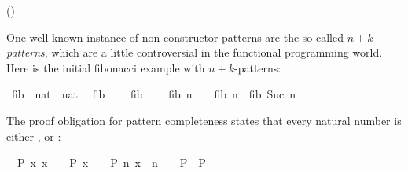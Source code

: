 \begin{isabellebody}
\begin{isamarkuptext}
  \begin{center}\hfill()\end{center}%
\end{isamarkuptext}%
\isamarkuptrue%
%
\begin{isamarkuptext}%
One well-known instance of non-constructor patterns are the
  so-called \emph{$n+k$-patterns}, which are a little controversial in
  the functional programming world. Here is the initial fibonacci
  example with $n+k$-patterns:%
\end{isamarkuptext}%
\isamarkuptrue%
\isamarkupfalse%
\ fib{}\ {\isacharcolon}{\isacharcolon}\ {\isachardoublequoteopen}nat\ {\isasymRightarrow}\ nat{\isachardoublequoteclose}\isanewline
{}\isanewline
\ \ {\isachardoublequoteopen}fib{}\ {}\ {\isacharequal}\ {}{\isachardoublequoteclose}\isanewline
{\isacharbar}\ {\isachardoublequoteopen}fib{}\ {}\ {\isacharequal}\ {}{\isachardoublequoteclose}\isanewline
{\isacharbar}\ {\isachardoublequoteopen}fib{}\ {\isacharparenleft}n\ {\isacharplus}\ {}{\isacharparenright}\ {\isacharequal}\ fib{}\ n\ {\isacharplus}\ fib{}\ {\isacharparenleft}Suc\ n{\isacharparenright}{\isachardoublequoteclose}\isanewline
%
\isadelimML
%
\endisadelimML
%
\isatagML
%
\endisatagML
{\isafoldML}%
%
\isadelimML
%
\endisadelimML
%
\isadelimproof
%
\endisadelimproof
%
\isatagproof
%
\begin{isamarkuptxt}%
The proof obligation for pattern completeness states that every natural number is
  either ,  or :

  \begin{isabelle}%
\ {}{\isachardot}\ {\isasymAnd}P\ x{\isachardot}\ {\isasymlbrakk}x\ {\isacharequal}\ {}\ {\isasymLongrightarrow}\ P{\isacharsemicolon}\ x\ {\isacharequal}\ {}\ {\isasymLongrightarrow}\ P{\isacharsemicolon}\ {\isasymAnd}n{\isachardot}\ x\ {\isacharequal}\ n\ {\isacharplus}\ {}\ {\isasymLongrightarrow}\ P{\isasymrbrakk}\ {\isasymLongrightarrow}\ P%
\end{isabelle}


\end{isamarkuptxt}
\end{isabellebody}
